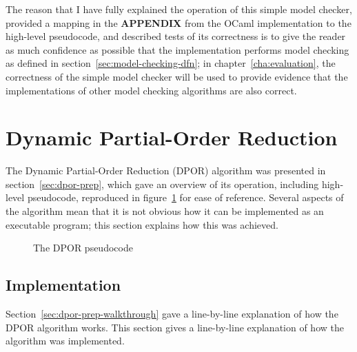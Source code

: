 \documentclass[12pt,a4paper,twoside,openright]{report}
\begin{document}
The reason that I have fully explained
the operation of this simple model checker,
provided a mapping
in the \textbf{APPENDIX} from the OCaml
implementation to the high-level
pseudocode, and described
tests of its correctness is to give the reader
as much confidence as possible
that the implementation performs
model checking as defined in
section~\ref{sec:model-checking-dfn}; in
chapter~\ref{cha:evaluation}, the
correctness of the simple model checker will be used
to provide evidence that the implementations of
other model checking algorithms are also correct.

\section{Dynamic Partial-Order Reduction}
The Dynamic Partial-Order Reduction (DPOR)
algorithm was presented in section~\ref{sec:dpor-prep},
which gave an overview of its operation,
including high-level pseudocode, reproduced
in figure~\ref{fig:dpor-imp-pscode} for ease
of reference. Several
aspects of the algorithm mean that it
is not obvious how it can be implemented
as an executable program; this
section explains how this was achieved.

\begin{figure}
	\dporpseudocode
	\caption{The DPOR pseudocode}
	\label{fig:dpor-imp-pscode}
\end{figure}

\subsection{Implementation}
Section~\ref{sec:dpor-prep-walkthrough} gave a
line-by-line explanation of how
the DPOR algorithm works. This section gives a
line-by-line explanation of how the algorithm
was implemented.
\end{document}
